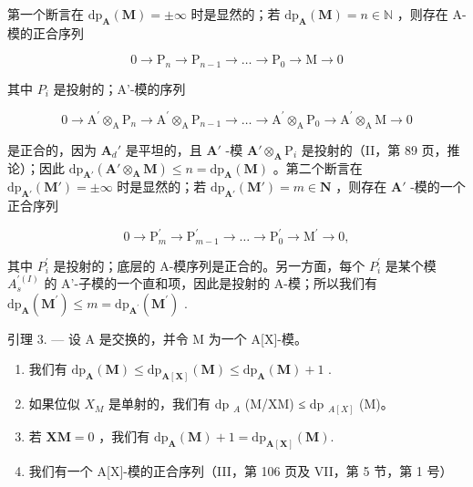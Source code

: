 第一个断言在 \(\mathrm{dp}_{\mathbf{A}}(\mathbf{M}) = \pm \infty\) 时是显然的；若 \(\mathrm{dp}_{\mathbf{A}}(\mathbf{M}) = n \in \mathbb{N}\) ，则存在 A-模的正合序列

\[
0 \rightarrow \mathrm{P} _ {n} \rightarrow \mathrm{P} _ {n - 1} \rightarrow \dots \rightarrow \mathrm{P} _ {0} \rightarrow \mathrm{M} \rightarrow 0
\]

其中 \(P_{i}\) 是投射的；A'-模的序列

\[
0 \rightarrow \mathrm{A} ^ {\prime} \otimes_ {\mathrm{A}} \mathrm{P} _ {n} \rightarrow \mathrm{A} ^ {\prime} \otimes_ {\mathrm{A}} \mathrm{P} _ {n - 1} \rightarrow \dots \rightarrow \mathrm{A} ^ {\prime} \otimes_ {\mathrm{A}} \mathrm{P} _ {0} \rightarrow \mathrm{A} ^ {\prime} \otimes_ {\mathrm{A}} \mathrm{M} \rightarrow 0
\]

是正合的，因为 \(\mathbf{A}_d'\) 是平坦的，且 \(\mathbf{A}'\) -模 \(\mathbf{A}' \otimes_{\mathbf{A}} \mathrm{P}_i\) 是投射的（II，第 89 页，推论）；因此 \(\mathrm{dp}_{\mathbf{A}'}(\mathbf{A}' \otimes_{\mathbf{A}} \mathbf{M}) \leqslant n = \mathrm{dp}_{\mathbf{A}}(\mathbf{M})\) 。第二个断言在 \(\mathrm{dp}_{\mathbf{A}'}(\mathbf{M}') = \pm \infty\) 时是显然的；若 \(\mathrm{dp}_{\mathbf{A}'}(\mathbf{M}') = m \in \mathbf{N}\) ，则存在 \(\mathbf{A}'\) -模的一个正合序列

\[
0 \to \mathrm{P} _ {m} ^ {\prime} \to \mathrm{P} _ {m - 1} ^ {\prime} \to \dots \to \mathrm{P} _ {0} ^ {\prime} \to \mathrm{M} ^ {\prime} \to 0,
\]

其中 \(P_{i}^{\prime}\) 是投射的；底层的 A-模序列是正合的。另一方面，每个 \(P_{i}^{\prime}\) 是某个模 \(A_{s}^{\prime(I)}\) 的 A'-子模的一个直和项，因此是投射的 A-模；所以我们有 \(\mathrm{dp}_{\mathbf{A}}(\mathbf{M}^{\prime}) \leqslant m = \mathrm{dp}_{\mathbf{A}^{\prime}}(\mathbf{M}^{\prime})\) .

引理 3. --- 设 A 是交换的，并令 M 为一个 A{[}X{]}-模。

\begin{enumerate}
\def\labelenumi{\alph{enumi})}
\item
  我们有 \(\mathrm{dp}_{\mathbf{A}}(\mathbf{M}) \leqslant \mathrm{dp}_{\mathbf{A}[\mathbf{X}]}(\mathbf{M}) \leqslant \mathrm{dp}_{\mathbf{A}}(\mathbf{M}) + 1\) .
\item
  如果位似 \(X_{M}\) 是单射的，我们有 dp \(_{A}\) (M/XM) ≤ dp \(_{A[X]}\) (M)。
\item
  若 \(\mathbf{XM} = 0\) ，我们有 \(\mathrm{dp}_{\mathbf{A}}(\mathbf{M}) + 1 = \mathrm{dp}_{\mathbf{A}[\mathbf{X}]}(\mathbf{M}).\)
\item
  我们有一个 A{[}X{]}-模的正合序列（III，第 106 页及 VII，第 5 节，第 1 号）
\end{enumerate}

